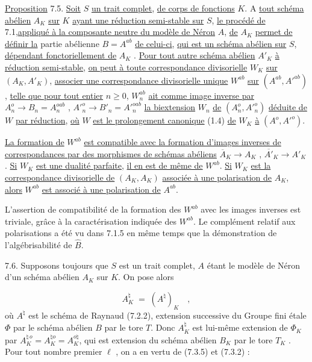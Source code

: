 \underline{Proposition} 7.5. \underline{Soit} $S$ \underline{un trait complet}, \underline{de corps de fonctions} $K$. A \underline{tout schéma abélien} $A_K$ \underline{sur} $K$ \underline{ayant une réduction semi-stable sur} $S$, \underline{le procédé de} 7.1,\underline{appliqué à la composante neutre du modèle de Néron} $A$, \underline{de} $A_K$ \underline{permet de définir la} partie abélienne $B = A^{ab}$ \underline{de celui-ci}, \underline{qui est un schéma abélien sur} $S$, \underline{dépendant fonctoriellement de} $A_K$ . \underline{Pour tout autre schéma abélien} $A'_K$ \underline{à réduction semi-stable}, \underline{on peut à toute correspondance divisorielle} $W_K$ \underline{sur} $(A_K,A'_K)$, \underline{associer une correspondance divisorielle unique} $W^{ab}$ \underline{sur} $(A^{ab},{A'}^{ab})$, \underline{telle que pour tout entier} $n \geq 0$, $W_n^{ab}$ \underline{ait comme image inverse par} $A_n^o \longrightarrow B_n = A_n^{oab}$ , ${A'}^{o}_{n} \longrightarrow B'_n = {A'}^{oab}_{n}$ \underline{la biextension} $W_n$ \underline{de} $(A_n^o,{A'}^{o}_{n})$ \underline{déduite de} $W$ \underline{par réduction}, \underline{où} $W$ \underline{est le prolongement canonique} (1.4) \underline{de} $W_K$ \underline{à} $(A^o,{A'}^{o})$.



\underline{La formation de} $W^{ab}$ \underline{est compatible avec la formation d'images inverses de correspondances par des morphismes de schémas abéliens} $\overline{A}_K \longrightarrow A_K$ , $\overline{A'}_K \longrightarrow A'_K$ . \underline{Si} $W_K$ \underline{est une dualité parfaite}, \underline{il en est de même de} $W^{ab}$. \underline{Si} $W_K$ \underline{est la correspondance divisorielle de} $(A_K,A_K)$ \underline{associée à une polarisation de} $A_K$, \underline{alors} $W^{ab}$ \underline{est associé à une polarisation de} $A^{ab}$.

L'assertion de compatibilité de la formation des $W^{ab}$ avec les images inverses est triviale, grâce à la caractérisation indiquée des $W^{ab}$. Le complément relatif aux polarisations a été vu dans 7.1.5 en même temps que la démonstration de l'algébrisabilité de $\hat{B}$.

7.6. Supposons toujours que $S$ est un trait complet, $A$ étant le modèle de Néron d'un schéma abélien $A_K$ sur $K$. On pose alors

\begin{equation}\tag{7.6.1}
A_K^{\natural} \;=\; (A^{\natural})_K \quad ,
\end{equation}
où $A^{\natural}$ est le schéma de Raynaud (7.2.2), extension successive du Groupe fini étale $\Phi$ par le schéma abélien $B$ par le tore $T$. Donc $A_K^{\natural}$ est lui-même extension de $\Phi_K$ par $A_K^{\natural\,o} = A^{\natural o}_K = A^{o\natural}_K$, qui est extension du schéma abélien $B_K$ par le tore $T_K$ . Pour tout nombre premier $\ell$ , on a en vertu de (7.3.5) et (7.3.2) :

